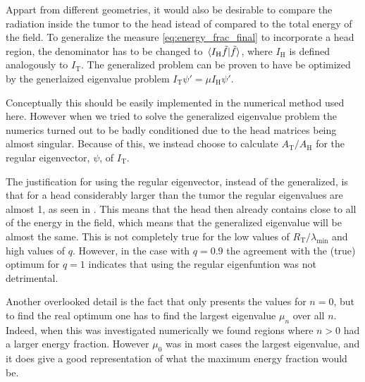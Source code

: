 \documentclass[11pt,a4paper, 
swedish,english %
]{article}
\newcommand{\RT}{\ensuremath{R_{\text{T}}}}
\newcommand{\tf}{\ensuremath{\tilde{f}}}
\begin{document}
Appart from different geometries, it would also be desirable to compare the radiation inside the tumor to the head istead of compared to the total energy of the field.
To generalize the measure \eqref{eq:energy_frac_final} to incorporate a head region, the denominator has to be changed to $\ip*{I_\text{H}\tf}{\tf}$, where $I_\text{H}$ is defined analogously to $I_\text{T}$. The generalized problem can be proven to have be optimized by the generlaized eigenvalue problem $I_\text{T} \psi'=\mu I_\text{H}\psi'$. 

Conceptually this should be easily implemented in the numerical method used here. However when we tried to solve the generalized eigenvalue problem the numerics turned out to be badly conditioned due to the head matrices being almost singular. 
Because of this, we instead choose to calculate $A_\text{T}/A_\text{H}$ for the regular eigenvector, $\psi$, of $I_\text{T}$. 

The justification for using the regular eigenvector, instead of the generalized, is that for a head considerably larger than the tumor the regular eigenvalues are almost 1, as seen in . This means that the head then already contains close to all of the energy in the field, which means that the generalized eigenvalue will be almost the same. This is not completely true for the low values of $\RT/\lambda_{\min}$ and high values of $q$. However, in the case with $q=0.9$ the agreement with the (true) optimum for $q=1$ indicates that using the regular eigenfuntion was not detrimental.

Another overlooked detail is the fact that  only presents the values for $n=0$, but to find the real optimum one has to find the largest eigenvalue $\mu_n$ over all $n$. Indeed, when this was investigated numerically we found regions where $n>0$ had a larger energy fraction. However $\mu_0$ was in most cases the largest eigenvalue, and it does give a good representation of what the maximum energy fraction would be.
\end{document}
